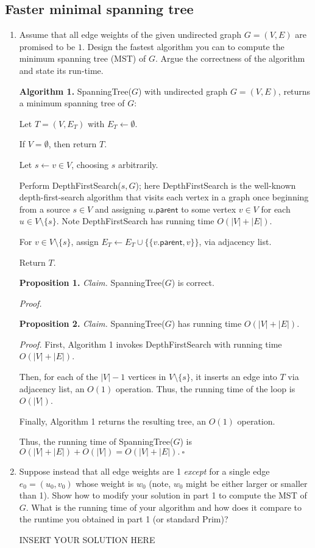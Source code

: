 \subsection{Faster minimal spanning tree}
\begin{enumerate}
    \item Assume that all edge weights of the given undirected graph $G = (V, E)$ are promised to be $1$. Design the fastest algorithm you can to compute the minimum spanning tree (MST) of $G$. Argue the correctness of the algorithm and state its run-time. 
    
\begin{solution}

\textbf{Algorithm 1. }{\sc SpanningTree}($G$) with undirected graph $G=(V,E)$, returns a minimum spanning tree of $G$:

Let $T=(V,E_T)$ with $E_T\leftarrow\emptyset$.

If $V=\emptyset$, then return $T$.

Let $s\leftarrow v\in V$, choosing $s$ arbitrarily.

Perform {\sc DepthFirstSearch}($s,G$); here {\sc DepthFirstSearch} is the well-known depth-first-search algorithm that visits each vertex in a graph once beginning from a source $s\in V$ and assigning $u.\mathsf{parent}$ to some vertex $v\in V$ for each $u\in V\setminus\{s\}$. Note {\sc DepthFirstSearch} has running time $O(|V|+|E|)$.

For $v\in V\setminus\{s\}$, assign $E_T\leftarrow E_T\cup\{\{v.\mathsf{parent},v\}\}$, via adjacency list.

Return $T$.

\textbf{Proposition 1. }\textit{Claim. }{\sc SpanningTree}($G$) is correct.

\textit{Proof. }

\textbf{Proposition 2. }\textit{Claim. }{\sc SpanningTree}($G$) has running time $O(|V|+|E|)$.

\textit{Proof. }First, Algorithm 1 invokes {\sc DepthFirstSearch} with running time $O(|V|+|E|)$.

Then, for each of the $|V|-1$ vertices in $V\setminus\{s\}$, it inserts an edge into $T$ via adjacency list, an $O(1)$ operation. Thus, the running time of the loop is $O(|V|)$.

Finally, Algorithm 1 returns the resulting tree, an $O(1)$ operation.

Thus, the running time of {\sc SpanningTree}($G$) is $O(|V|+|E|)+O(|V|)=O(|V|+|E|).~\square$
\end{solution}
    \item Suppose instead that all edge weights are 1 \emph{except} for a single edge $e_0 = (u_0, v_0)$ whose weight is $w_0$ (note, $w_0$ might be either larger or smaller than 1). Show how to modify your solution in part 1 to compute the MST of $G$. What is the running time of your algorithm and how does it compare to the runtime you obtained in part 1 (or standard Prim)?
\begin{solution}   INSERT YOUR SOLUTION HERE   \end{solution}
\end{enumerate}